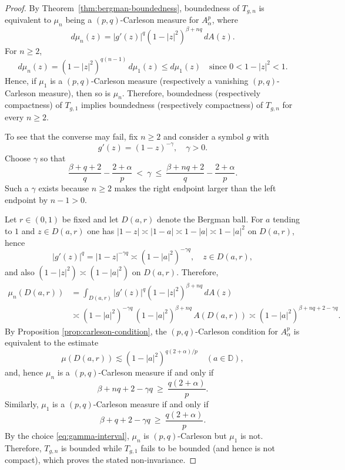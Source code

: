 \documentclass[preprint,12pt]{elsarticle}
\numberwithin{equation}{section}
\theoremstyle{remark}
\begin{document}
\begin{proof}
By Theorem~\ref{thm:bergman-boundedness}, boundedness of $T_{g,n}$ is equivalent to
$\mu_n$ being a $(p,q)$-Carleson measure for $A_\alpha^p$, where
\begin{equation*}
d\mu_n(z)=|g'(z)|^q(1-|z|^2)^{\beta+nq}\,dA(z).
\end{equation*}
For $n\ge2$,
\begin{equation*}
d\mu_n(z)=(1-|z|^2)^{q(n-1)}\,d\mu_1(z)\le d\mu_1(z) \quad \text{since } 0<1-|z|^2<1.
\end{equation*}
Hence, if $\mu_1$ is a $(p,q)$-Carleson measure (respectively a vanishing $(p,q)$-Carleson
measure), then so is $\mu_n$. Therefore, boundedness (respectively compactness) of
$T_{g,1}$ implies boundedness (respectively compactness) of $T_{g,n}$ for every $n\ge2$.

To see that the converse may fail, fix $n\ge2$ and consider a symbol $g$ with
\begin{equation*}
g'(z)=(1-z)^{-\gamma},\quad \gamma>0.
\end{equation*}
Choose $\gamma$ so that
\begin{equation}\label{eq:gamma-interval}
\frac{\beta+q+2}{q}-\frac{2+\alpha}{p}
\ <\ \gamma \ \le\
\frac{\beta+nq+2}{q}-\frac{2+\alpha}{p}.
\end{equation}
Such a $\gamma$ exists because $n\ge2$ makes the right endpoint larger than the left endpoint by $n-1>0$.

Let $r\in(0,1)$ be fixed and let $D(a,r)$ denote the Bergman ball. For $a$ tending to $1$ and $z\in D(a,r)$ one has $|1-z|\asymp |1-a|\asymp 1-|a|\asymp 1-|a|^2$ on $D(a,r)$, hence
\begin{equation*}
|g'(z)|^q = |1-z|^{-\gamma q}\asymp (1-|a|^2)^{-\gamma q},
\quad z\in D(a,r),
\end{equation*}
and also $(1-|z|^2)\asymp (1-|a|^2)$ on $D(a,r)$. Therefore,
\begin{align*}
\mu_n(D(a,r))
&=\int_{D(a,r)} |g'(z)|^q(1-|z|^2)^{\beta+nq}\,dA(z)\\
&\asymp (1-|a|^2)^{-\gamma q}\,(1-|a|^2)^{\beta+nq}\,A(D(a,r))
\asymp (1-|a|^2)^{\beta+nq+2-\gamma q}.
\end{align*}
By Proposition \ref{prop:carleson-condition}, the $(p,q)$-Carleson condition for $A_\alpha^p$ is equivalent to the estimate
\begin{equation*}
\mu(D(a,r))\lesssim (1-|a|^2)^{q(2+\alpha)/p}\quad (a\in\mathbb D),
\end{equation*}
and, hence $\mu_n$ is a $(p,q)$-Carleson measure if and only if
\begin{equation*}
\beta+nq+2-\gamma q \ \ge\ \frac{q(2+\alpha)}{p}.
\end{equation*}
Similarly, $\mu_1$ is a $(p,q)$-Carleson measure if and only if
\begin{equation*}
\beta+q+2-\gamma q \ \ge\ \frac{q(2+\alpha)}{p}.
\end{equation*}
By the choice \eqref{eq:gamma-interval}, $\mu_n$ is $(p,q)$-Carleson but $\mu_1$ is not.
Therefore, $T_{g,n}$ is bounded while $T_{g,1}$ fails to be bounded (and hence is not
compact), which proves the stated non-invariance.


\end{proof}
\end{document}

